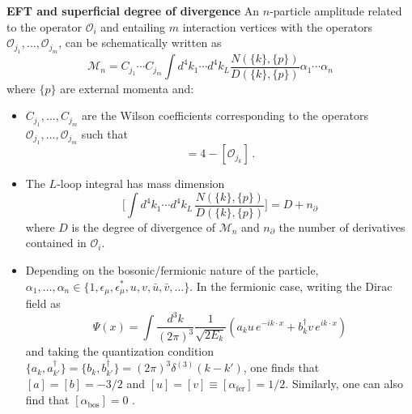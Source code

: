 \documentclass[prl,twocolumn,twoside,preprintnumbers,superscriptaddress, nofootinbib]{revtex4-2}
\newcommand{\Ocal}[0]{\mathcal{O}}
\begin{document}
{\bf EFT and superficial degree of divergence}
An $n$-particle amplitude related to the operator $\Ocal_i$ 
and entailing $m$ interaction vertices with the operators $\Ocal_{j_1},\dotsc,\Ocal_{j_m}$, can be schematically written as
%
\begin{equation}
    \!\!\!\mathcal M_{n} \!= C_{j_1}\!\!\dotsm C_{j_m} \!\!
     \int \!\! d^4 k_1 \!\dotsm d^4 k_L \frac{N
     (\{k\},\!\{p\})}{D(\{k\},\!\{p\})} 
    \alpha_1\!\dotsm \alpha_{n} 
\end{equation}
where $\{p\}$ are external momenta and:
\begin{itemize}
    \item $C_{j_1},\dotsc, C_{j_m}$ are the Wilson coefficients corresponding to the operators $\Ocal_{j_1},\dotsc,\Ocal_{j_m}$ 
    such that
    \begin{equation}
        [C_{j_k}]= 4 - [\Ocal_{j_k}]\,.
    \end{equation}        


    \item The $L$-loop integral has mass dimension 
    \begin{equation}
    \bigg[\int d^4 k_1\dotsi d^4 k_L\, \frac{N(\{k\},\{p\})}{D(\{k\},\{p\})}\bigg]=
    D + n_\partial
    \end{equation}        
    where $D$ is the degree of divergence of 
    $\mathcal M_{n}$ and $n_\partial$ the number 
    of derivatives contained in $\Ocal_i$.



    \item Depending on the bosonic/fermionic nature of the particle, $\alpha_1,\dotsc, \alpha_{n} \in \{1,\epsilon_\mu,\epsilon_\mu^*,u,v,\bar u, \bar v,\dotsc\}$. In the fermionic case, writing the 
    Dirac field as
    \begin{equation}
     \Psi(x)\! =\! \int\! \frac{d^3k}{(2\pi)^3}  \frac{1}{\sqrt{2E_k}} 
     \left(a_k u \,e^{-ik\cdot x} \!+ 
     b^\dagger_k v \,e^{ik\cdot x}\right)
    \end{equation}
%
    and taking the quantization condition $\{a_k,a^\dagger_{k'}\}=\{b_k,b^\dagger_{k'}\}=(2\pi)^3\delta^{(3)}(k-k')$, 
    one finds that $[a]=[b]=-3/2$ and 
    $[u]=[v]\equiv [\alpha_{\text{fer}}]=1/2$. Similarly, one can also find that $[\alpha_{\text{bos}}] = 0$ .
\end{itemize}
\end{document}
